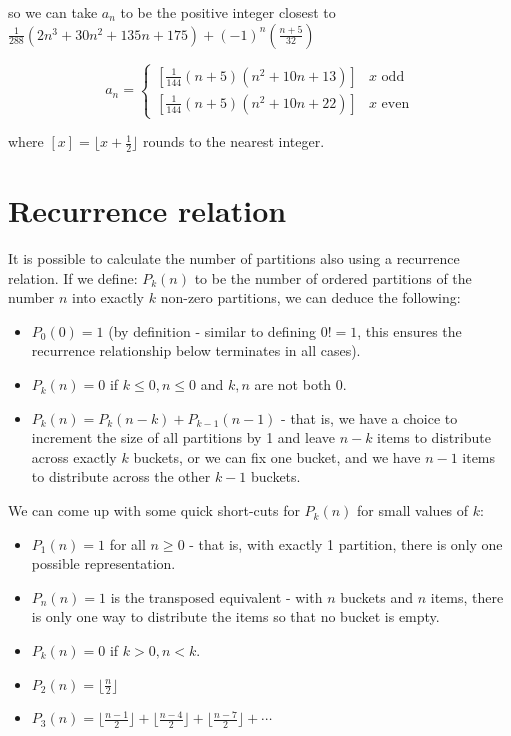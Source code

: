 \documentclass{article}
\begin{document}
so we can take $a_n$ to be the positive integer closest to $\frac{1}{288}(2n^3 + 30n^2 + 135n + 175) + (-1)^n(\frac{n+5}{32})$

\[
	a_n = 
	\begin{cases}
		\left[ \frac{1}{144} (n + 5)(n^2 + 10 n + 13) \right] & x \text{ odd} \\
		\left[ \frac{1}{144} (n + 5)(n^2 + 10 n + 22) \right] & x \text{ even}
	\end{cases}
\]

where $\left[x\right] = \lfloor x+\frac{1}{2} \rfloor$ rounds to the nearest integer.

\section{Recurrence relation}

It is possible to calculate the number of partitions also using a recurrence relation. If we define:
$P_k(n)$ to be the number of ordered partitions of the number $n$ into exactly $k$ non-zero partitions, we can deduce the following:
\begin{itemize}
    \item $P_0(0) = 1$ (by definition - similar to defining $0! = 1$, this ensures the recurrence relationship below terminates in all cases).
    \item $P_k(n) = 0$ if $k\leq 0, n\leq 0$ and $k,n$ are not both $0$.
    \item $P_k(n) = P_k(n-k) + P_{k-1}(n-1)$ - that is, we have a choice to increment the size of all partitions by 1 and leave $n-k$ items to distribute across exactly $k$ buckets, or we can fix one bucket, and we have $n-1$ items to distribute across the other $k-1$ buckets.
\end{itemize}

We can come up with some quick short-cuts for $P_k(n)$ for small values of $k$:
\begin{itemize}
    \item $P_1(n) = 1$ for all $n \geq 0$ - that is, with exactly 1 partition, there is only one possible representation.
    \item $P_n(n) = 1$ is the transposed equivalent - with $n$ buckets and $n$ items, there is only one way to distribute the items so that no bucket is empty.
    \item $P_k(n) = 0$ if $k > 0, n< k$.
    \item $P_2(n) = \lfloor \frac{n}{2} \rfloor$
    \item $P_3(n) = \lfloor \frac{n-1}{2} \rfloor + \lfloor \frac{n-4}{2} \rfloor + \lfloor \frac{n-7}{2} \rfloor  + \cdots $
\end{itemize}
\end{document}
